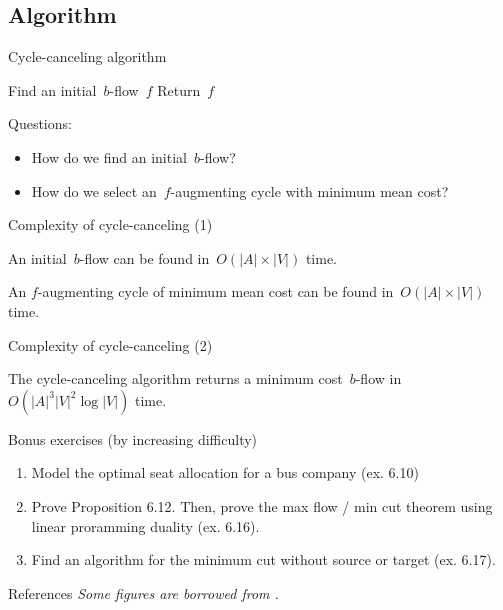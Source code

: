 \documentclass{beamer}
\begin{document}
\subsection{Algorithm}

\begin{frame}[t]{Cycle-canceling algorithm \citep{goldbergFindingMinimumcostCirculations1989}} \pause
  \setcounter{algocf}{4}
  \begin{algorithm}[H]
        \caption{Cycle-canceling algorithm}
   \SetAlgoLined \pause
     \pause
   Find an initial~$b$-flow~$f$\; \pause
    \pause
   Return~$f$
  \end{algorithm}
  \vfill \pause
  Questions: \pause
  \begin{itemize}
    \item How do we find an initial~$b$-flow? \pause
    \item How do we select an~$f$-augmenting cycle with minimum mean cost?
  \end{itemize}
\end{frame}

\begin{frame}[t]{Complexity of cycle-canceling (1)} \pause
  \begin{proposition}[ex 6.4]
    An initial~$b$-flow can be found in~$O(|A| \times |V|)$ time.
  \end{proposition}
  \vfill \pause
  \begin{proposition}[ex 6.3]
    An $f$-augmenting cycle of minimum mean cost can be found in~$O(|A| \times |V|)$ time.
  \end{proposition}
  \vfill
\end{frame}

\begin{frame}{Complexity of cycle-canceling (2)} \pause
  \begin{theorem}[6.10]
    The cycle-canceling algorithm returns a minimum cost~$b$-flow in~$O(|A|^3 |V|^2 \log|V|)$ time.
  \end{theorem}
\end{frame}


\begin{frame}{Bonus exercises (by increasing difficulty)} \pause
  \begin{enumerate}
    \item Model the optimal seat allocation for a bus company (ex. 6.10)
    \item Prove Proposition 6.12. Then, prove the max flow / min cut theorem using linear proramming duality (ex. 6.16).
    \item Find an algorithm for the minimum cut without source or target (ex. 6.17).
  \end{enumerate}
\end{frame}

\begin{frame}{References}
  \textit{\small Some figures are borrowed from \cite{gaubertRechercheOperationnelleAspects2016}.}
  \medskip
 \tiny
 \renewcommand{\section}[2]{\vskip 0.05em}
 
\end{frame}
\end{document}
